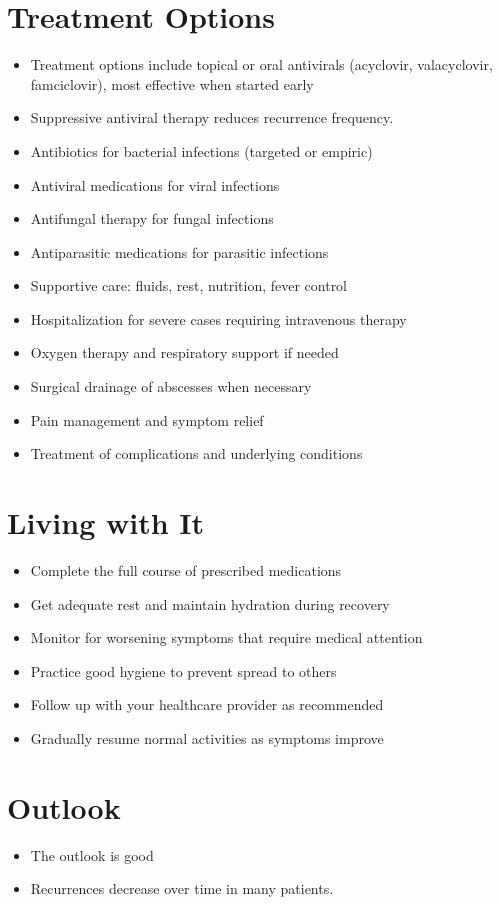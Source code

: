 \section{Treatment Options}
\begin{itemize}[noitemsep]
  \item Treatment options include topical or oral antivirals (acyclovir, valacyclovir, famciclovir), most effective when started early
  \item Suppressive antiviral therapy reduces recurrence frequency.
  \item Antibiotics for bacterial infections (targeted or empiric)
  \item Antiviral medications for viral infections
  \item Antifungal therapy for fungal infections
  \item Antiparasitic medications for parasitic infections
  \item Supportive care: fluids, rest, nutrition, fever control
  \item Hospitalization for severe cases requiring intravenous therapy
  \item Oxygen therapy and respiratory support if needed
  \item Surgical drainage of abscesses when necessary
  \item Pain management and symptom relief
  \item Treatment of complications and underlying conditions
\end{itemize}
\section{Living with It}
\begin{itemize}[noitemsep]
  \item Complete the full course of prescribed medications
  \item Get adequate rest and maintain hydration during recovery
  \item Monitor for worsening symptoms that require medical attention
  \item Practice good hygiene to prevent spread to others
  \item Follow up with your healthcare provider as recommended
  \item Gradually resume normal activities as symptoms improve
\end{itemize}
\section{Outlook}
\begin{itemize}[noitemsep]
  \item The outlook is good
  \item Recurrences decrease over time in many patients.
\end{itemize}
